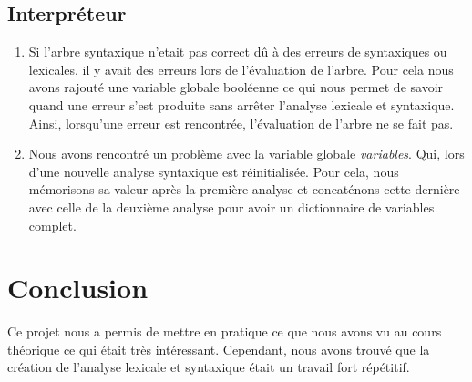 \documentclass[a4paper, 12pt]{article}
\begin{document}
    \subsection{Interpréteur}
        \begin{enumerate}
            \item Si l'arbre syntaxique n'etait pas correct dû à des erreurs de syntaxiques ou lexicales, il y avait des erreurs lors de l'évaluation de l'arbre. Pour cela nous avons rajouté une variable globale booléenne ce qui nous permet de savoir quand une erreur s'est produite sans arrêter l'analyse lexicale et syntaxique. Ainsi, lorsqu'une erreur est rencontrée, l'évaluation de l'arbre ne se fait pas.
            
            \item Nous avons rencontré un problème avec la variable globale \textit{variables}. Qui, lors d'une nouvelle analyse syntaxique est réinitialisée. Pour cela, nous mémorisons sa valeur après la première analyse et concaténons cette dernière avec celle de la deuxième analyse pour avoir un dictionnaire de variables complet.
        \end{enumerate}
\section{Conclusion}
Ce projet nous a permis de mettre en pratique ce que nous avons vu au cours théorique ce qui était très intéressant. Cependant, nous avons trouvé que la création de l'analyse lexicale et syntaxique était un travail fort répétitif.
\end{document}
